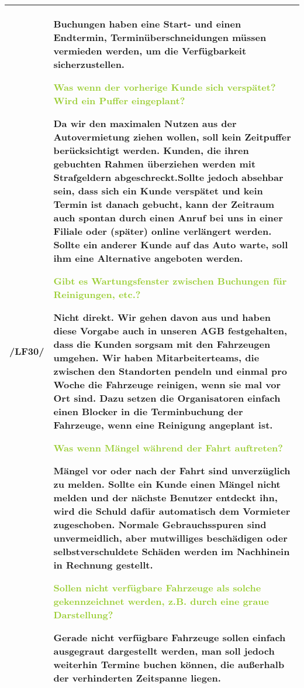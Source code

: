 \begin{tabular}{l | p{13cm}}
    \hline
    /LF30/ & Buchungen haben eine Start- und einen Endtermin, Terminüberschneidungen müssen vermieden werden, um die Verfügbarkeit sicherzustellen. 
    
    \textcolor{YellowGreen}{Was wenn der vorherige Kunde sich verspätet? Wird ein Puffer eingeplant?}

    \textcolor{NavyBlue}{Da wir den maximalen Nutzen aus der Autovermietung ziehen wollen, soll kein Zeitpuffer berücksichtigt werden. Kunden, die ihren gebuchten Rahmen überziehen werden mit Strafgeldern abgeschreckt.Sollte jedoch absehbar sein, dass sich ein Kunde verspätet und kein Termin ist danach gebucht, kann der Zeitraum auch spontan durch einen Anruf bei uns in einer Filiale oder (später) online verlängert werden. Sollte ein anderer Kunde auf das Auto warte, soll ihm eine Alternative angeboten werden.}

    \textcolor{YellowGreen}{Gibt es Wartungsfenster zwischen Buchungen für Reinigungen, etc.?}

    \textcolor{NavyBlue}{Nicht direkt. Wir gehen davon aus und haben diese Vorgabe auch in unseren AGB festgehalten, dass die Kunden sorgsam mit den Fahrzeugen umgehen. Wir haben Mitarbeiterteams, die zwischen den Standorten pendeln und einmal pro Woche die Fahrzeuge reinigen, wenn sie mal vor Ort sind. Dazu setzen die Organisatoren einfach einen Blocker in die Terminbuchung der Fahrzeuge, wenn eine Reinigung angeplant ist.}

    \textcolor{YellowGreen}{Was wenn Mängel während der Fahrt auftreten?}

    \textcolor{NavyBlue}{Mängel vor oder nach der Fahrt sind unverzüglich zu melden. Sollte ein Kunde einen Mängel nicht melden und der nächste Benutzer entdeckt ihn, wird die Schuld dafür automatisch dem Vormieter zugeschoben. Normale Gebrauchsspuren sind unvermeidlich, aber mutwilliges beschädigen oder selbstverschuldete Schäden werden im Nachhinein in Rechnung gestellt.}

    \textcolor{YellowGreen}{Sollen nicht verfügbare Fahrzeuge als solche gekennzeichnet werden, z.B. durch eine graue Darstellung?}

    \textcolor{NavyBlue}{Gerade nicht verfügbare Fahrzeuge sollen einfach ausgegraut dargestellt werden, man soll jedoch weiterhin Termine buchen können, die außerhalb der verhinderten Zeitspanne liegen.} \\

    \hline
\end{tabular}

